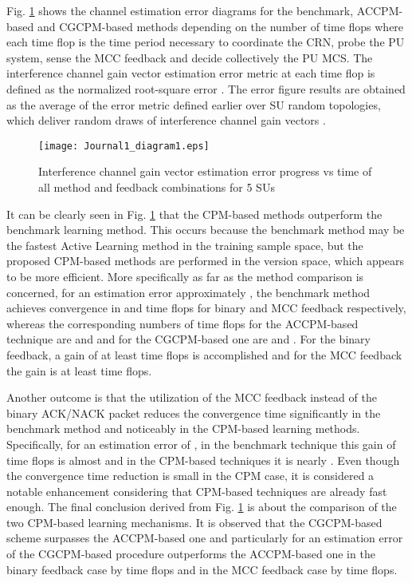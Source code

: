 \documentclass[journal]{IEEEtran}
\begin{document}
Fig. \ref{fig3} shows the channel estimation error diagrams for the benchmark, ACCPM-based and CGCPM-based methods depending on the number of time flops where each time flop is the time period  necessary to coordinate the CRN, probe the PU system, sense the MCC feedback and decide collectively the PU MCS. The interference channel gain vector estimation error metric at each time flop is defined as the normalized root-square error . The error figure results are obtained as the average of the error metric defined earlier over  SU random topologies, which deliver  random draws of interference channel gain vectors . 

\begin{figure}[!h]
\centering
\texttt{[image: Journal1\_diagram1.eps]}
\caption{Interference channel gain vector estimation error progress vs time of all method and feedback combinations for 5 SUs}
\label{fig3}
\end{figure}
It can be clearly seen in Fig. \ref{fig3} that the CPM-based methods outperform the benchmark learning method. This occurs because the benchmark method may be the fastest Active Learning method in the training sample space, but the proposed CPM-based methods are performed in the version space, which appears to be more efficient. More specifically as far as the method comparison is concerned, for an estimation error approximately , the benchmark method achieves convergence in  and  time flops for binary and MCC feedback respectively, whereas the corresponding numbers of time flops for the ACCPM-based technique are  and  and for the CGCPM-based one are  and . For the binary feedback, a gain of at least  time flops is accomplished and for the MCC feedback the gain is at least  time flops.  

Another outcome is that the utilization of the MCC feedback instead of the binary ACK/NACK packet reduces the convergence time significantly in the benchmark method and noticeably in the CPM-based learning methods. Specifically, for an estimation error of , in the benchmark technique this gain of time flops is almost  and in the CPM-based techniques it is nearly . Even though the convergence time reduction is small in the CPM case, it is considered a notable enhancement considering that CPM-based techniques are already fast enough. The final conclusion derived from Fig. \ref{fig3} is about the comparison of the two CPM-based learning mechanisms. It is observed that the CGCPM-based scheme surpasses the ACCPM-based one and particularly for an estimation error of  the CGCPM-based procedure outperforms the ACCPM-based one in the binary feedback case by  time flops and in the MCC feedback case by  time flops.
\end{document}
